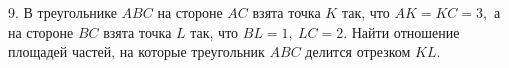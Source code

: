 9. В треугольнике $ABC$ на стороне $AC$ взята точка $K$ так, что $AK=KC=3,$ а на стороне $BC$ взята точка $L$ так, что $BL=1,\ LC=2.$ Найти отношение площадей частей, на которые треугольник $ABC$ делится отрезком $KL.$\\
